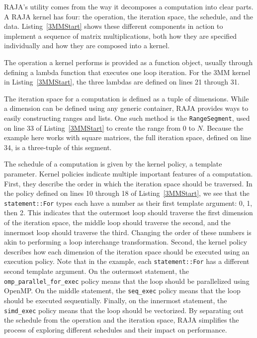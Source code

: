 RAJA's utility comes from the way it decomposes a computation into clear parts.
A RAJA kernel has four: the operation, the iteration space, the schedule, and the data. 
Listing~\ref{3MMStart} shows these different components in action to implement a sequence of matrix multiplications, both how they are specified individually and how they are composed into a kernel.

The operation a kernel performs is provided as a function object, usually through defining a lambda function that executes one loop iteration.
For the 3MM kernel in Listing~\ref{3MMStart}, the three lambdas are defined on lines 21 through 31. 

The iteration space for a computation is defined as a tuple of dimensions.
While a dimension can be defined using any generic container, RAJA provides ways to easily constructing ranges and lists.
One such method is the \verb.RangeSegment., used on line 33 of Listing~\ref{3MMStart} to create the range from $0$ to $N$. 
Because the example here works with square matrices, the full iteration space, defined on line 34, is a three-tuple of this segment. 

The schedule of a computation is given by the kernel policy, a template parameter. 
Kernel policies indicate multiple important features of a computation.
First, they describe the order in which the iteration space should be traversed.
In the policy defined on lines 10 through 18 of Listing~\ref{3MMStart}, we see that the \verb.statement::For. types each have a number as their first template argument: 0, 1, then 2.
This indicates that the outermost loop should traverse the first dimension of the iteration space, the middle loop should traverse the second, and the innermost loop should traverse the third. 
Changing the order of these numbers is akin to performing a loop interchange transformation.
Second, the kernel policy describes how each dimension of the iteration space should be executed using an execution policy.
Note that in the example, each \verb.statement::For. has a different second template argument.
On the outermost statement, the \verb.omp_parallel_for_exec. policy means that the loop should be parallelized using OpenMP\@. 
On the middle statement, the \verb.seq_exec. policy means that the loop should be executed sequentially.
Finally, on the innermost statement, the \verb.simd_exec. policy means that the loop should be vectorized.
By separating out the schedule from the operation and the iteration space, RAJA simplifies the process of exploring different schedules and their impact on performance.

